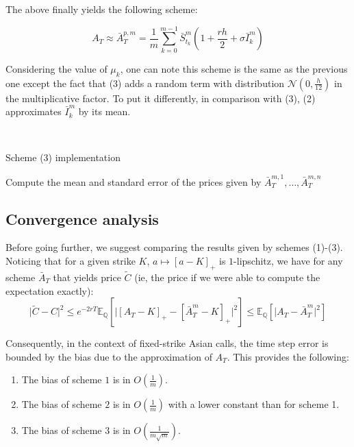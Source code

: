 \documentclass{article}
\begin{document}
The above finally yields the following scheme:

\begin{equation}
    A_T \approx \bar A_T^{p, m} = \frac{1}{m} \sum_{k=0}^{m-1}
    	\bar S_{t_k}^m \left( 1 + \frac{rh}{2} + \sigma \bar I_k^m \right) \tag{3}
\end{equation}

Considering the value of $\mu_k$, one can note this scheme is the same as the previous one except the fact
that (3) adds a random term with distribution $\mathcal N(0, \frac{h}{12})$ in the multiplicative factor.
To put it differently, in comparison with (3), (2) approximates $\bar I_k^m$ by its mean.

\

\begin{algorithm}[H]
\caption{Scheme (3) implementation}
Compute the mean and standard error of the prices given by $\bar A_T^{m, 1}, \dots, \bar A_T^{m, n}$\;
\;
\end{algorithm}

\subsection*{Convergence analysis}

Before going further, we suggest comparing the results given by schemes (1)-(3).
Noticing that for a given strike $K$,
$a \mapsto [ a - K ]_+$ is $1$-lipschitz, we have for any scheme $\bar A_T$ that yields price $\widetilde C$
(ie, the price if we were able to compute the expectation exactly):
\[
	\vert \widetilde C - C \vert^2
	\leqslant e^{-2rT} \mathbb E_{\mathbb Q} \left[ \vert [ A_T - K ]_+ - [ \bar A_T^m - K ]_+ \vert^2 \right]
	\leqslant \mathbb E_{\mathbb Q} \left[ \vert A_T - \bar A_T^m \vert^2 \right]
\]

\noindent Consequently, in the context of fixed-strike Asian calls, the time step error is bounded
by the bias due to the approximation of $A_T$. This provides the following:
\begin{enumerate}[label=(\roman*)]
\item The bias of scheme $1$ is in $O \left( \frac{1}{m} \right)$.
\item The bias of scheme $2$ is in $O \left( \frac{1}{m} \right)$ with a lower constant than for scheme 1.
\item The bias of scheme $3$ is in $O \left( \frac{1}{m\sqrt{m}} \right)$.
\end{enumerate}
\end{document}
